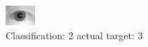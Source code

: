 \begin{figure}[h!]
\begin{center}
\includegraphics[width=0.60\columnwidth]{figures/ID1187_class_2_target_3.png}
\end{center}
\caption{ Classification: 2 actual target: 3}
\label{fig:ID1187_class_2_target_3}
\end{figure}

